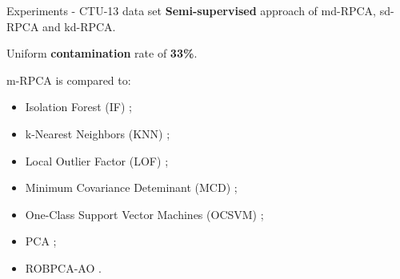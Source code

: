 \documentclass[newPxFont, numfooter, sectionpages]{beamer}
\begin{document}
\begin{frame}[c]{Experiments - CTU-13 data set}
    \textbf{Semi-supervised} approach of md-RPCA, sd-RPCA and kd-RPCA.
    
    Uniform \textbf{contamination} rate of \textbf{33\%}.
    
    m-RPCA is compared to:
    \begin{itemize}
        \item Isolation Forest (IF) \cite{liu2008isolation};
        \item k-Nearest Neighbors (KNN) \cite{angiulli2002fast};
        \item Local Outlier Factor (LOF) \cite{breunig2000lof};
        \item Minimum Covariance Deteminant (MCD) \cite{rousseeuw1999fastmcd};
        \item One-Class Support Vector Machines (OCSVM) \cite{scholkopf2001estimating};
        \item PCA \cite{shyu2003novel};
        \item ROBPCA-AO \cite{hubert2009robustskewed}.
	\end{itemize}
\end{frame}
\end{document}
